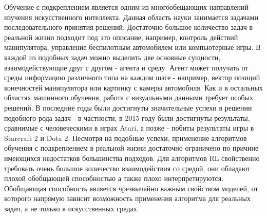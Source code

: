 





Обучение с подкреплением является одним из многообещающих направлений изучения искусственного интеллекта. 
Данная область науки занимается задачами последовательного принятия решений. Достаточно большое количество задач в реальной жизни подходит под это описание, например, контроль действий манипулятора, управление беспилотным автомобилем или компьютерные игры. 
В каждой из подобных задач можно выделить две основные сущности, взаимодействующие друг с другом - агента и среду. 
Агент может получать от среды информацию различного типа на каждом шаге - например, вектор позиций конечностей манипулятора или картинку с камеры автомобиля. 
Как и в остальных областях машинного обучения, работа с визуальными данными требует особых решений. 
В последние годы были достигнуты значительные успехи в решении подобного рода задач - в частности, в 2015 году были достигнуты  результаты, сравнимые с человеческими в играх Atari, а позже -  побиты результаты игры в Starcraft 2 и Dota 2. 
Несмотря на подобные успехи, применение алгоритмов обучения с подкреплением в реальной жизни достаточно ограничено по причине имеющихся недостатков большинства подходов. 
Для алгоритмов RL свойственно требовать очень большое количество взаимодействия со средой, они обладают плохой обобщающей способностью а также плохо интерпретируются. 
Обобщающая способность является чрезвычайно важным свойством моделей, от которого напрямую зависит возможность применения алгоритма для реальных задач, а не только в искусственных средах.


